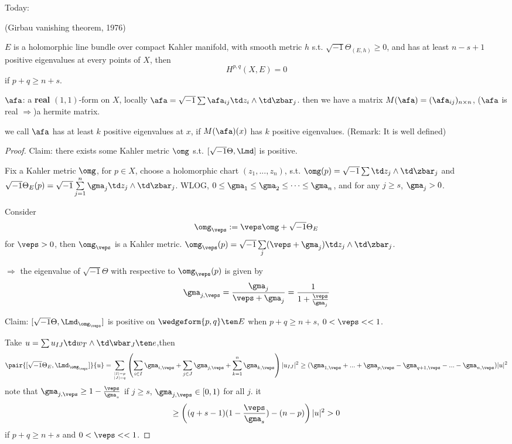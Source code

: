 Today:
\begin{thm}(Girbau vanishing theorem, 1976)

$E$ is a holomorphic line bundle over compact Kahler manifold, 
with smooth metric $h$ s.t. $\sqrt{-1}\Theta_{(E,h)}\geq 0$,
and has at least $n-s+1$ positive eigenvalues at every points of $X$, then
$$H^{p,q}(X,E)=0$$
if $p+q\geq n+s$.
\end{thm}

$\afa$: a \textbf{real} $(1,1)$-form on $X$, 
locally $\afa=\sqrt{-1}\sum\afa_{ij}\td z_i\wedge\td\zbar_j$.
then we have a matrix $M(\afa)=(\afa_{ij})_{n\times n}$, 
($\afa$ is real $\Rightarrow$)a hermite matrix.

we call $\afa$ has at least $k$ positive eigenvalues at $x$,
if $M(\afa)(x)$ has $k$ positive eigenvalues.
(Remark: It is well defined)

\begin{proof}
Claim: there exists some Kahler metric $\omg$ 
s.t. $[\sqrt{-1}\Theta,\Lmd]$ is positive.

Fix a Kahler metric $\omg$,
for $p\in X$, choose a holomorphic chart $(z_1,...,z_n)$,
s.t. $\omg(p)=\sqrt{-1}\sum\td z_j\wedge\td\zbar_j$ and 
$\sqrt{-1}\Theta_E(p)=\sqrt{-1}\sum\limits_{j=1}^{n}\gma_j\td z_j\wedge\td\zbar_j$.
WLOG, $0\leq\gma_1\leq\gma_2\leq\cdots\leq\gma_n$,
and for any $j\geq s$, $\gma_j>0$.

Consider 
$$\omg_\veps:=\veps\omg+\sqrt{-1}\Theta_E$$
for $\veps>0$, then $\omg_\veps$ is a Kahler metric.
$\omg_\veps(p)=\sqrt{-1}\sum\limits_{j}(\veps+\gma_j)\td z_j\wedge\td\zbar_j$.

$\Rightarrow$ the eigenvalue of $\sqrt{-1}\Theta$ with respective to
$\omg_\veps(p)$ is given by
$$\gma_{j,\veps}=\frac{\gma_j}{\veps+\gma_j}=
\frac{1}{1+\frac{\veps}{\gma_j}}$$

Claim: $[\sqrt{-1}\Theta,\Lmd_{\omg_\veps}]$ is positive on 
$\wedgeform{p,q}\ten E$ when $p+q\geq n+s$, $0<\veps<<1$.

Take $u=\sum\limits u_{IJ}\td w_T\wedge\td\wbar_J\ten e$,then
$$
  \pair{[\sqrt{-1}\Theta_E,\Lmd_{\omg_\veps}]}{u}
=
  \sum_{|I|=p\atop|J|=q}
    \left(
      \sum_{i\in I}
        \gma_{i,\veps}
     +\sum_{j\in J}
       \gma_{j,\veps}
     +\sum_{k=1}^{n}
       \gma_{k,\veps}
    \right)
    |u_{IJ}|^2
\geq
  (\gma_{1,\veps}+...+\gma_{p,\veps}-\gma_{q+1,\veps}-...-\gma_{n,\veps})
  |u|^2
$$
note that $\gma_{j,\veps}\geq 1-\frac{\veps}{\gma_s}$
if $j\geq s$, $\gma_{j,\veps}\in[0,1)$ for all $j$. it 
$$
\geq
  \left(
    (q+s-1)(1-\frac{\veps}{\gma_s})
   -(n-p)
  \right)
  |u|^2
>0
$$
if $p+q\geq n+s$ and $0<\veps<<1$.
\end{proof}

